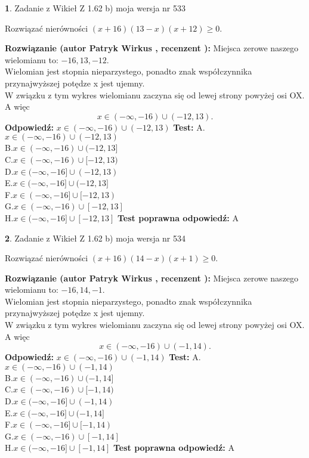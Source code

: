 \documentclass[12pt, a4paper]{article}
\theoremstyle{definition} %
\newtheorem{zad}{}
\newcommand{\zadStart}[1]{\begin{zad}#1\newline}
\newcommand{\zadStop}{\end{zad}}
\newcommand{\rozwStart}[2]{\noindent \textbf{Rozwiązanie (autor #1 , recenzent #2): }\newline}
\newcommand{\rozwStop}{\newline}
\newcommand{\odpStart}{\noindent \textbf{Odpowiedź:}\newline}
\newcommand{\odpStop}{\newline}
\newcommand{\testStart}{\noindent \textbf{Test:}\newline}
\newcommand{\testStop}{\newline}
\newcommand{\kluczStart}{\noindent \textbf{Test poprawna odpowiedź:}\newline}
\newcommand{\kluczStop}{\newline}
\begin{document}
\zadStart{Zadanie z Wikieł Z 1.62 b) moja wersja nr 533}

Rozwiązać nierówności $(x+16)(13-x)(x+12)\ge0$.
\zadStop
\rozwStart{Patryk Wirkus}{}
Miejsca zerowe naszego wielomianu to: $-16, 13, -12$.\\
Wielomian jest stopnia nieparzystego, ponadto znak współczynnika przy\linebreak najwyższej potędze x jest ujemny.\\ W związku z tym wykres wielomianu zaczyna się od lewej strony powyżej osi OX. A więc $$x \in (-\infty,-16) \cup (-12,13).$$
\rozwStop
\odpStart
$x \in (-\infty,-16) \cup (-12,13)$
\odpStop
\testStart
A.$x \in (-\infty,-16) \cup (-12,13)$\\
B.$x \in (-\infty,-16) \cup (-12,13]$\\
C.$x \in (-\infty,-16) \cup [-12,13)$\\
D.$x \in (-\infty,-16] \cup (-12,13)$\\
E.$x \in (-\infty,-16] \cup (-12,13]$\\
F.$x \in (-\infty,-16] \cup [-12,13)$\\
G.$x \in (-\infty,-16) \cup [-12,13]$\\
H.$x \in (-\infty,-16] \cup [-12,13]$
\testStop
\kluczStart
A
\kluczStop



\zadStart{Zadanie z Wikieł Z 1.62 b) moja wersja nr 534}

Rozwiązać nierówności $(x+16)(14-x)(x+1)\ge0$.
\zadStop
\rozwStart{Patryk Wirkus}{}
Miejsca zerowe naszego wielomianu to: $-16, 14, -1$.\\
Wielomian jest stopnia nieparzystego, ponadto znak współczynnika przy\linebreak najwyższej potędze x jest ujemny.\\ W związku z tym wykres wielomianu zaczyna się od lewej strony powyżej osi OX. A więc $$x \in (-\infty,-16) \cup (-1,14).$$
\rozwStop
\odpStart
$x \in (-\infty,-16) \cup (-1,14)$
\odpStop
\testStart
A.$x \in (-\infty,-16) \cup (-1,14)$\\
B.$x \in (-\infty,-16) \cup (-1,14]$\\
C.$x \in (-\infty,-16) \cup [-1,14)$\\
D.$x \in (-\infty,-16] \cup (-1,14)$\\
E.$x \in (-\infty,-16] \cup (-1,14]$\\
F.$x \in (-\infty,-16] \cup [-1,14)$\\
G.$x \in (-\infty,-16) \cup [-1,14]$\\
H.$x \in (-\infty,-16] \cup [-1,14]$
\testStop
\kluczStart
A
\kluczStop
\end{document}
